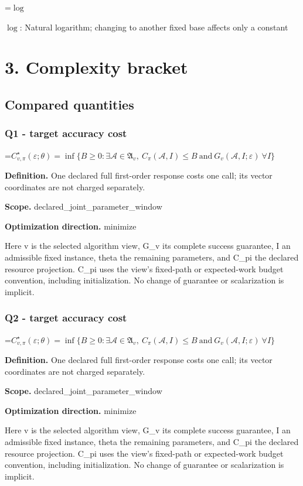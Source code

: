 \documentclass[10pt,a4paper]{article}
\newcommand{\AtlasMath}[1]{\par\begingroup\centering\setbox0=\hbox{$\displaystyle #1$}\ifdim\wd0>1.4\linewidth\typeout{ATLAS WIDE FORMULA: \the\wd0}\fi\ifdim\wd0>\linewidth\resizebox{\linewidth}{!}{\box0}\else\box0\fi\par\endgroup}
\newcommand{\AtlasInlineMath}[1]{\begingroup\setbox0=\hbox{$#1$}\ifdim\wd0>.4\linewidth\endgroup\AtlasMath{#1}\else\endgroup$#1$\fi}
\begin{document}
\AtlasInlineMath{\log}: Natural logarithm; changing to another fixed base affects only a constant

\section{3. Complexity bracket}
\subsection{Compared quantities}
\subsubsection{Q1 - target accuracy cost}
\AtlasMath{C^\star_{v,\pi}(\varepsilon;\theta)=\inf\{B\ge0:\exists\mathcal A\in\mathfrak A_v,\ C_\pi(\mathcal A,I)\le B\ \text{and}\ G_v(\mathcal A,I;\varepsilon)\ \forall I\}}
\textbf{Definition.} One declared full first-order response costs one call; its vector coordinates are not charged separately.

\textbf{Scope.} declared\_joint\_parameter\_window

\textbf{Optimization direction.} minimize

Here v is the selected algorithm view, G\_v its complete success guarantee, I an admissible fixed instance, theta the remaining parameters, and C\_pi the declared resource projection. C\_pi uses the view's fixed-path or expected-work budget convention, including initialization. No change of guarantee or scalarization is implicit.

\subsubsection{Q2 - target accuracy cost}
\AtlasMath{C^\star_{v,\pi}(\varepsilon;\theta)=\inf\{B\ge0:\exists\mathcal A\in\mathfrak A_v,\ C_\pi(\mathcal A,I)\le B\ \text{and}\ G_v(\mathcal A,I;\varepsilon)\ \forall I\}}
\textbf{Definition.} One declared full first-order response costs one call; its vector coordinates are not charged separately.

\textbf{Scope.} declared\_joint\_parameter\_window

\textbf{Optimization direction.} minimize

Here v is the selected algorithm view, G\_v its complete success guarantee, I an admissible fixed instance, theta the remaining parameters, and C\_pi the declared resource projection. C\_pi uses the view's fixed-path or expected-work budget convention, including initialization. No change of guarantee or scalarization is implicit.
\end{document}
